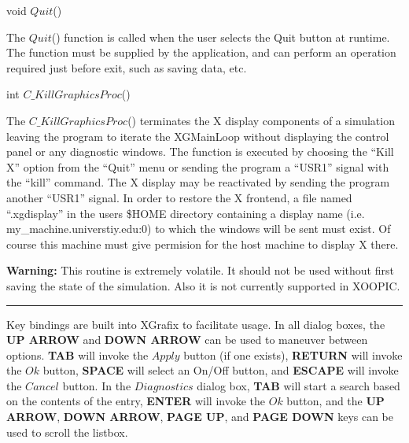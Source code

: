 \begin{flushleft}
void $Quit$()
\end{flushleft}

The $Quit$() function is called when the user selects the Quit button at 
runtime.  The function must be supplied by the application, and can perform
an operation required just before exit, such as saving data, etc.

\begin{flushleft}
int $C\_KillGraphicsProc$()
\end{flushleft}

The $C\_KillGraphicsProc$() terminates the X display components of a
simulation leaving the program to iterate the XGMainLoop without
displaying the control panel or any diagnostic windows.  The function
is executed by choosing the ``Kill X'' option from the ``Quit'' menu
or sending the program a ``USR1'' signal with the ``kill'' command.
The X display may be reactivated by sending the program another
``USR1'' signal.  In order to restore the X frontend, a file named
``.xgdisplay'' in the users \$HOME directory containing a display name
(i.e. my\_machine.universtiy.edu:0) to which the windows will be sent
must exist.  Of course this machine must give permision for the
host machine to display X there.

{\bf Warning:} This routine is
extremely volatile.  It should not be used without first saving the
state of the simulation.  Also it is not currently supported in XOOPIC.

\def\xlen{4in}
\begin{minipage}{\xlen}
\begin{flushright}
\rule{\xlen}{.5pt}
\end{flushright}
\end{minipage}

Key bindings are built into XGrafix to facilitate usage.  In all dialog boxes,
the {\bf UP ARROW} and {\bf DOWN ARROW} can be used to maneuver between 
options.  {\bf TAB} will invoke the $Apply$ button (if one exists),
{\bf RETURN} will invoke the $Ok$ button, {\bf SPACE} will select an On/Off 
button, and {\bf ESCAPE} will invoke the
$Cancel$ button.  In the $Diagnostics$ dialog box, {\bf TAB} will start
a search based on the contents of the entry, {\bf ENTER} will invoke the
$Ok$ button, and the {\bf UP ARROW}, {\bf DOWN ARROW}, {\bf PAGE UP}, and
{\bf PAGE DOWN} keys can be used to scroll the listbox.
















